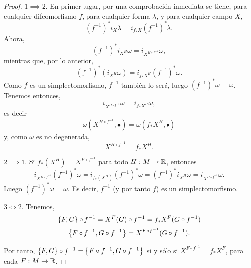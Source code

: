 \begin{proof}

  $1\implies 2$. En primer lugar, por una comprobación inmediata se tiene, para cualquier difeomorfismo $f$, para cualquier forma $\lambda$, y para cualquier campo $X$, 
  \begin{equation*}
    (f^{-1})^*i_X \lambda = i_{f_*X}(f^{-1})^* \lambda.
  \end{equation*}
  Ahora,
  \begin{equation*}
    (f^{-1})^*i_{X^H}\omega=i_{X^{H \circ f^{-1}}}\omega,
  \end{equation*}
  mientras que, por lo anterior,
  \begin{equation*}
    (f^{-1})^*(i_{X^H}\omega)=i_{f_*X^H} (f^{-1})^*\omega.
  \end{equation*}
  Como $f$ es un simplectomorfismo, $f^{-1}$ también lo será, luego $(f^{-1})^* \omega = \omega$.
  Tenemos entonces,
  \begin{equation*}
    i_{X^{H \circ f^{-1}}} \omega = i_{f_*X^H}\omega,
  \end{equation*}
  es decir 
  \begin{equation*}
    \omega(X^{H\circ f^{-1}},\bullet)=\omega(f_*X^H,\bullet)
  \end{equation*}
  y, como $\omega$ es no degenerada,
  \begin{equation*}
    X^{H \circ f^{-1}}=f_*X^H.
  \end{equation*}

  $2\implies 1$. Si $f_*(X^H)=X^{H \circ f^{-1}}$ para todo $H:M \rightarrow \mathbb{R}$, entonces
  \begin{equation*}
    i_{X^{H\circ f^{-1}}}(f^{-1})^* \omega=i_{f_*(X^H)}(f^{-1})^* \omega = (f^{-1})^*i_{X^H}\omega=i_{X^{H \circ f^{-1}}}\omega.
  \end{equation*}
  Luego $(f^{-1})^* \omega = \omega$. Es decir, $f^{-1}$ (y por tanto $f$) es un simplectomorfismo.

  $3\Longleftrightarrow 2$. Tenemos,
  \begin{equation*}
    \left\lbrace F,G\right\rbrace \circ f^{-1} = X^{F}(G) \circ f^{-1} = f_* X^F (G \circ f^{-1})
  \end{equation*}
  \begin{equation*}
    \left\lbrace F\circ f^{-1},G \circ f^{-1}\right\rbrace = X^{F\circ f^{-1}}(G \circ f^{-1}).
  \end{equation*}

  Por tanto, $\left\lbrace F,G\right\rbrace \circ f^{-1}=\left\lbrace F\circ f^{-1},G \circ f^{-1}\right\rbrace$ si y sólo si $X^{F \circ f^{-1}}= f_* X^{F}$, para cada $F: M \rightarrow \mathbb{R}$.
\end{proof}

